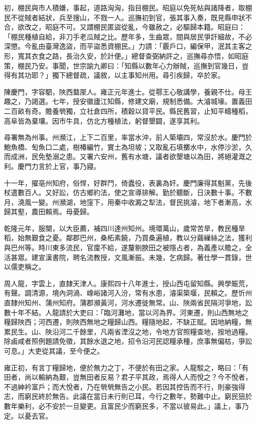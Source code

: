 \begin{pinyinscope}
初，棚民與市人積嫌，事起，道路洶洶，指目棚民。昭庭以免死帖與諸降者，取棚民不從賊者結狀，兵至搜山，不戮一人。巡撫初到官，張其事入奏，既見縣申狀不合，欲改之，昭庭不可。又謂棚民匿盜從亂，今雖赦之，必驅歸本籍。昭庭曰：「棚民種植自給，非刀手老瓜賊之比。歷年多，生齒眾，間與居民爭訐細故，不必深懲。今亂由臺灣逸盜，而平盜悉資棚民。」力請：「覈戶口，編保甲，泯其主客之形，寬其衣食之路，長治久安，於計便。」總督查弼納許之，巡撫尋亦悟，如昭庭策，棚民乃安。事聞，世宗諭九卿曰：「知縣以數年心力辦賊，巡撫到官幾日，豈得有其功耶？」獨下總督疏，議敘，以主事知州用。尋引疾歸，卒於家。

陳慶門，字容駟，陜西盩厔人。雍正元年進士。從鄠王心敬講學，養親不仕。母王趣之，乃謁選。七年，授安徽廬江知縣，修建文廟，規制悉備。大濬城壕。置義田二百畝有奇。贍養煢獨，立社倉四所，積穀以貸平民。縣民舊習，止知平疇種稻，高阜皆為棄壤。因市牛具，仿北方種植法，躬督墾闢，遂享其利。

尋署無為州事。州瀕江，上下二百里，率當水沖，前人築壩四，常沒於水。慶門於鮑魚橋、匋魚口二處，樹椿編竹，實土為坦坡；又取亂石填擲水中，水停沙淤，久而成洲，民免墊溺之患。又署六安州，舊有水塘，議者欲墾塘以為田，將絕灌溉之利。慶門力言於上官，事乃寢。

十一年，擢亳州知府，俗悍，好群鬥，倚蠹役，表裏為奸。慶門廉得其魁黨，先後杖遣數百人。又好訟，仿古鄉約法，使之宣導排解。勤於聽斷，日決數十事。不數月，澆風一變。州瀕湖，地窪下，用秦中收澱之犁法，督民挑濬，地下者漸高，水歸其壑，農田賴焉。母憂歸。

乾隆元年，服闋，以大臣薦，補四川達州知州。境環萬山，歲常苦旱，教民種旱稻，始無艱食之憂。鄰郡巴州，桑柘素饒，乃買桑遍植，教以分繭繅絲之法，獲利與巴州等。時川東多流民，官廩不給，遂釐剔腴田之被隱占者，為義產以贍之，全活甚眾。建宣漢書院，聘名流教授，文風漸振。未幾，乞病歸。著仕學一貫錄，世以儒吏稱之。

周人龍，字雲上，直隸天津人。康熙四十八年進士，授山西屯留知縣。興學賑荒，有聲。調清源，境內洞渦、嶑峪諸河入汾，常有水患，濬渠築堰，民賴之。歷忻州直隸州知州、蒲州知府。蒲郡瀕黃河，河水遷徙無常。山、陜兩省民隔河爭地，訟數十年不結。人龍請於大吏曰：「臨河灘地，當以河為界。河東遷，則山西無地之糧歸陜西；河西遷，則陜西無地之糧歸山西。糧隨地起，不缺正賦。因地納糧，無累民生。山、陜沿河二千餘里，凡兩省湮沒之地，令地方官照糧查地，按地過糧。除鹵咸者照例題請免徵，其餘水退之地，招令沿河民認糧承種，庶事無偏枯，爭訟可息。」大吏從其議，至今便之。

雍正初，有言丁糧歸地，便於無力之丁，不便於有田之家。人龍駁之，略曰：「有田者，尚以輸納為艱，豈無田者反易？君子平其政，焉得人人而悅之？今不悅者，不過紳衿富戶；而大悅者，乃在煢煢無告之小民。若因其控告而不行，則豪強得志，而窮民終於無告。此議在當日未行則已耳，今行之數年，勢難中止。窮民狃於數年樂利，必不安於一旦變更。且富民少而窮民多，不當以彼易此。」議上，事乃定。以憂去官。


\end{pinyinscope}
